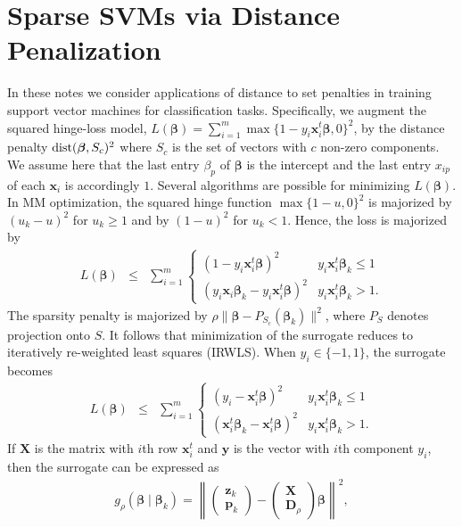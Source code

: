 \documentclass[11pt]{article}
\def\dist{\mathop{\rm dist}\nolimits}
\newcommand{\bp}{\boldsymbol{p}}
\newcommand{\bx}{\boldsymbol{x}}
\newcommand{\by}{\boldsymbol{y}}
\newcommand{\bz}{\boldsymbol{z}}
\newcommand{\bD}{\boldsymbol{D}}
\newcommand{\bX}{\boldsymbol{X}}
\newcommand{\bbeta}{\boldsymbol{\beta}}
\begin{document}
\section*{\center Sparse SVMs via Distance Penalization}

In these notes we consider applications of distance to set penalties in training support vector machines for classification tasks.
Specifically, we augment the squared hinge-loss model, $L(\bbeta)=\sum_{i=1}^m \max\{1-y_i \bx_i^t\bbeta,0\}^2$, by the distance penalty $\dist(\bbeta, S_{c})^{2}$ where $S_{c}$ is the set of vectors with $c$ non-zero components.
We assume here that the last entry $\beta_p$ of $\bbeta$ is the intercept and the last entry $x_{ip}$ of each $\bx_i$ is accordingly $1$.
Several algorithms are possible for minimizing $L(\bbeta)$.
In MM optimization, the squared hinge function $\max\{1-u,0\}^2$ is majorized by $(u_k-u)^2$ for $u_k \ge 1$ and by $(1-u)^2$ for $u_k < 1$.
Hence, the loss is majorized by
\begin{eqnarray*}
L(\bbeta) & \le & \sum_{i=1}^m
\begin{cases} (1-y_i \bx_i^t \bbeta)^2 & y_i \bx_i^t \bbeta_k \le 1 \\
(y_i \bx_i\bbeta_k - y_i \bx_i^t \bbeta)^2 & y_i \bx_i^t \bbeta_k > 1 .\end{cases}
\end{eqnarray*} 
The sparsity penalty is majorized by $\rho \|\bbeta-P_{S_{c}}(\bbeta_k)\|^2$, where $P_{S}$ denotes projection onto $S$. It follows that minimization of the surrogate reduces to iteratively re-weighted least squares (IRWLS). When $y_i \in \{-1,1\}$, the surrogate becomes
\begin{eqnarray*}
L(\bbeta) & \le & \sum_{i=1}^m
\begin{cases} (y_i - \bx_i^t \bbeta)^2 & y_i \bx_i^t \bbeta_k \le 1 \\
(\bx_i^t \bbeta_k - \bx_i^t \bbeta)^2 & y_i \bx_i^t \bbeta_k > 1 . \end{cases}
\end{eqnarray*}
If $\bX$ is the matrix with $i$th row $\bx_i^t$ and $\by$ is the vector with $i$th component $y_i$, then the surrogate can be expressed as
\begin{eqnarray*}
g_{\rho}(\bbeta \mid \bbeta_{k})
=
\left\|\begin{pmatrix}\bz_k \\\bp_{k} \end{pmatrix}-
\begin{pmatrix} \bX \\ \bD_{\rho}\end{pmatrix}\bbeta
\right\|^2,
\end{eqnarray*}
\end{document}
